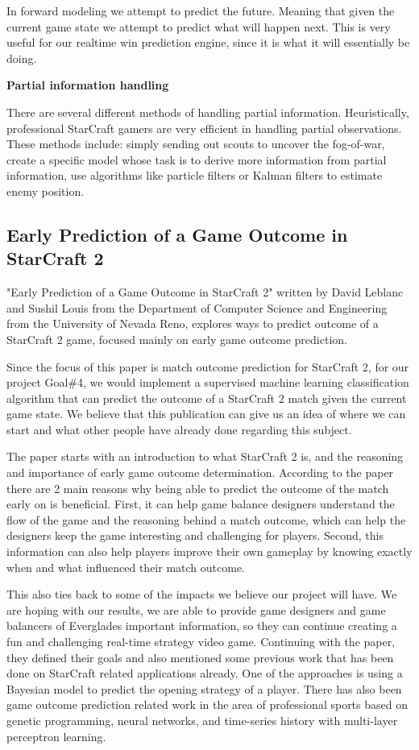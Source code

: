 \documentclass[a4paper,12pt]{report}
\newcommand{\msection}[1]{\noindent\textbf{#1}}
\begin{document}
In forward modeling we attempt to predict the future. Meaning that given the current game state we attempt to predict what will happen next. This is very useful for our realtime win prediction engine, since it is what it will essentially be doing.

\msection{Partial information handling}

There are several different methods of handling partial information. Heuristically, professional StarCraft gamers are very efficient in handling partial observations. These methods include: simply sending out scouts to uncover the fog-of-war, create a specific model whose task is to derive more information from partial information, use algorithms like particle filters or Kalman filters to estimate enemy position.

\subsection{Early Prediction of a Game Outcome in StarCraft 2}

"Early Prediction of a Game Outcome in StarCraft 2" written by David Leblanc and Sushil Louis from the Department of Computer Science and Engineering from the University of Nevada Reno, explores ways to predict outcome of a StarCraft 2 game, focused mainly on early game outcome prediction.

Since the focus of this paper is match outcome prediction for StarCraft 2, for our project Goal\#4, we would implement a supervised machine learning classification algorithm that can predict the outcome of a StarCraft 2 match given the current game state. We believe that this publication can give us an idea of where we can start and what other people have already done regarding this subject.

The paper starts with an introduction to what StarCraft 2 is, and the reasoning and importance of early game outcome determination. According to the paper there are 2 main reasons why being able to predict the outcome of the match early on is beneficial. First, it can help game balance designers understand the flow of the game and the reasoning behind a match outcome, which can help the designers keep the game interesting and challenging for players. Second, this information can also help players improve their own gameplay by knowing exactly when and what influenced their match outcome.

This also ties back to some of the impacts we believe our project will have. We are hoping with our results, we are able to provide game designers and game balancers of Everglades important information, so they can continue creating a fun and challenging real-time strategy video game.
Continuing with the paper, they defined their goals and also mentioned some previous work that has been done on StarCraft related applications already. One of the approaches is using a Bayesian model to predict the opening strategy of a player. There has also been game outcome prediction related work in the area of professional sports based on genetic programming, neural networks, and time-series history with multi-layer perceptron learning.
\end{document}
